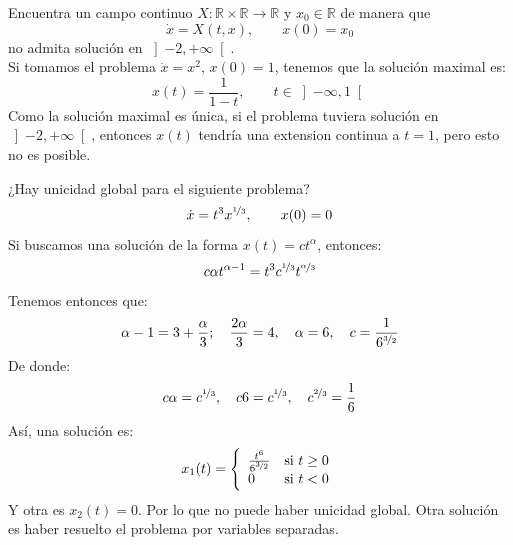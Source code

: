 \documentclass[12pt]{article}
\begin{document}
    \begin{ejercicio}
        Encuentra un campo continuo $X:\mathbb{R}\times\mathbb{R}\to \mathbb{R}$ y $x_0\in \mathbb{R}$ de manera que
        \begin{equation*}
            \dot{x} = X(t,x), \qquad x(0) = x_0
        \end{equation*}
        no admita solución en $\left]-2,+\infty\right[$.\\

        \noindent
        Si tomamos el problema $\dot{x} = x^2$, $x(0) = 1$, tenemos que la solución maximal es:
        \begin{equation*}
            x(t) = \frac{1}{1-t}, \qquad t\in \left]-\infty,1\right[
        \end{equation*}
        Como la solución maximal es única, si el problema tuviera solución en $\left]-2,+\infty\right[$, entonces $x(t)$ tendría una extension continua a $t=1$, pero esto no es posible.
    \end{ejercicio}

    \begin{ejercicio}
        ¿Hay unicidad global para el siguiente problema?
        \begin{equation*}
            \dot{x} = t^3 x^{\nicefrac{1}{3}}, \qquad x(0) = 0
        \end{equation*}
        Si buscamos una solución de la forma $x(t) = ct^\alpha$, entonces:
        \begin{equation*}
            c\alpha t^{\alpha-1} = t^3 c^{\nicefrac{1}{3}} t^{\nicefrac{\alpha}{3}}
        \end{equation*}
        Tenemos entonces que:
        \begin{equation*}
            \alpha-1 = 3 + \frac{\alpha}{3}; \quad \frac{2\alpha}{3} = 4, \quad \alpha = 6, \quad c = \frac{1}{6^{\nicefrac{3}{2}}}
        \end{equation*}
        De donde:
        \begin{equation*}
            c\alpha = c^{\nicefrac{1}{3}}, \quad c6 = c^{\nicefrac{1}{3}}, \quad c^{\nicefrac{2}{3}} = \frac{1}{6}
        \end{equation*}
        Así, una solución es:
        \begin{equation*}
            x_1(t) = \left\{\begin{array}{ll}
                \frac{t^6}{6^{\nicefrac{3}{2}}} & \text{si\ } t\geq 0 \\
                 0 & \text{si\ }  t < 0
            \end{array}\right. 
        \end{equation*}
        Y otra es $x_2(t) = 0$. Por lo que no puede haber unicidad global. Otra solución es haber resuelto el problema por variables separadas.
  \end{ejercicio}
\end{document}
